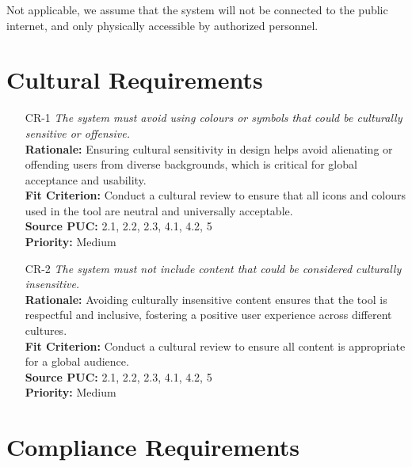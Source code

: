 \documentclass[12pt]{article}
\begin{document}
Not applicable, we assume that the system will not be connected to the public
internet, and only physically accessible by authorized personnel.

\section{Cultural Requirements}
\begin{itemize}[leftmargin=*]
  \item[CR-1] \emph{The system must avoid using colours or symbols that could be
          culturally sensitive or offensive.}\\[2mm]
        \textbf{Rationale:} Ensuring cultural sensitivity in design helps avoid alienating or offending users from diverse backgrounds, which is critical for global acceptance and usability.\\
        \textbf{Fit Criterion:} Conduct a cultural review to ensure that all icons and colours used in the tool are neutral and universally acceptable.\\
        \textbf{Source PUC:} 2.1, 2.2, 2.3, 4.1, 4.2, 5 \\
        \textbf{Priority:} Medium

  \item[CR-2] \emph{The system must not include content that could be considered
          culturally insensitive.}\\[2mm]
        \textbf{Rationale:} Avoiding culturally insensitive content ensures that the tool is respectful and inclusive, fostering a positive user experience across different cultures.\\
        \textbf{Fit Criterion:} Conduct a cultural review to ensure all content is appropriate for a global audience.\\
        \textbf{Source PUC:} 2.1, 2.2, 2.3, 4.1, 4.2, 5 \\
        \textbf{Priority:} Medium
\end{itemize}

\section{Compliance Requirements}
\end{document}
